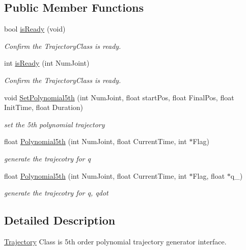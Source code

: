 \subsection*{Public Member Functions}
\begin{DoxyCompactItemize}
\item 
bool \hyperlink{classhyu_ctrl_1_1_trajectory_ae7ad2c75ec2b482dfb79364e24858f66}{is\+Ready} (void)
\begin{DoxyCompactList}\small\item\em Confirm the Trajectory\+Class is ready. \end{DoxyCompactList}\item 
int \hyperlink{classhyu_ctrl_1_1_trajectory_a0747f722e56a5c51431d973d6ea585c7}{is\+Ready} (int Num\+Joint)
\begin{DoxyCompactList}\small\item\em Confirm the Trajectory\+Class is ready. \end{DoxyCompactList}\item 
void \hyperlink{classhyu_ctrl_1_1_trajectory_aa60d7230e70b463cd967e38f37b45821}{Set\+Polynomial5th} (int Num\+Joint, float start\+Pos, float Final\+Pos, float Init\+Time, float Duration)
\begin{DoxyCompactList}\small\item\em set the 5th polynomial trajectory \end{DoxyCompactList}\item 
float \hyperlink{classhyu_ctrl_1_1_trajectory_af913157330cd55ac4882bd504dd04c1c}{Polynomial5th} (int Num\+Joint, float Current\+Time, int $\ast$Flag)
\begin{DoxyCompactList}\small\item\em generate the trajecotry for q \end{DoxyCompactList}\item 
float \hyperlink{classhyu_ctrl_1_1_trajectory_ac7bf1ad2993f3eb33750518cdbb11678}{Polynomial5th} (int Num\+Joint, float Current\+Time, int $\ast$Flag, float $\ast$q\+\_\+)
\begin{DoxyCompactList}\small\item\em generate the trajecotry for q, qdot \end{DoxyCompactList}\end{DoxyCompactItemize}


\subsection{Detailed Description}
\hyperlink{classhyu_ctrl_1_1_trajectory}{Trajectory} Class is 5th order polynomial trajectory generator interface. 

